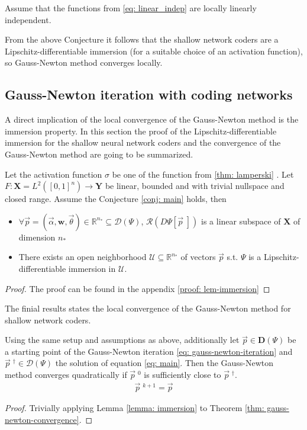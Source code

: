 \begin{conjecture}
    \label{conj: main}
    Assume that the functions from \ref{eq: linear_indep} are locally
    linearly independent.
\end{conjecture}
From the above Conjecture it follows that the shallow network coders are a
Lipschitz-differentiable immersion (for a suitable choice of an activation
function), so Gauss-Newton method converges locally.
\subsection{Gauss-Newton iteration with coding networks}
A direct implication of the local convergence of the Gauss-Newton method is
the immersion property. In this section the proof of the
Lipschitz-differentiable immersion for the shallow neural network coders and
the convergence of the Gauss-Newton method are going to be summarized.
\begin{lemma}
    \label{lemma: immersion}
    Let the activation function $\sigma$ be one of the function from
    \ref{thm: lamperski} \cite{lamperski_2022}. Let $F:\mathbf{X}=L^{2}\left(
    [0, 1]^{n}\right) \to \mathbf{Y}$ be linear, bounded and with trivial
    nullspace and closed range. Assume the Conjecture \ref{conj: main}
    holds, then
    \begin{itemize}
        \item $\forall \vec{p} = (\vec{\alpha}, \mathbf{w}, \vec{\theta}) \in
            \mathbb{R}^{n_*} \subseteq \mathcal{D}(\Psi)$,
            $\mathcal{R}(D\Psi[\vec{p}\;])$ is a linear
            subspace of $\mathbf{X}$ of dimension $n_*$
        \item There exists an open neighborhood $\mathcal{U} \subseteq
            \mathbb{R}^{n_*}$ of vectors $\vec{p}$ s.t. $\Psi$ is a
            Lipschitz-differentiable immersion in $\mathcal{U}$.
    \end{itemize}
\end{lemma}
\begin{proof}
    The proof can be found in the appendix \ref{proof: lem-immersion}
\end{proof}


The finial results states the local convergence of the Gauss-Newton method
for shallow network coders.
\begin{theorem}
    Using the same setup and assumptions as above, additionally let $\vec{p}
    \in \mathbf{D}(\Psi)$ be a starting point of the Gauss-Newton iteration
    \ref{eq: gauss-newton-iteration} and $\vec{p}\;^{\dagger} \in
    \mathcal{D}(\Psi)$ the solution of equation \ref{eq: main}. Then the
    Gauss-Newton method converges quadratically if
    $\vec{p}\;^{0}$ is sufficiently close to $\vec{p}\;^{\dagger}$.
    \begin{align}
        \vec{p}\;^{k+1} = \vec{p}
    \end{align}
\end{theorem}
\begin{proof}

    Trivially applying Lemma \ref{lemma: immersion} to Theorem
    \ref{thm: gauss-newton-convergence}.
\end{proof}




